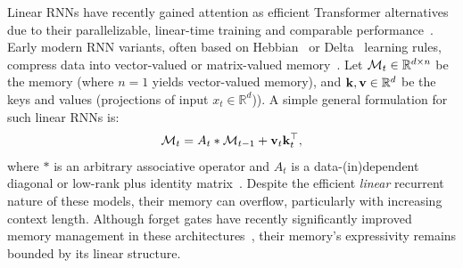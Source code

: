 Linear RNNs have recently gained attention as efficient Transformer alternatives due to their parallelizable, linear-time training and comparable performance~\citep{sun2023retentive, peng2023rwkv}. Early modern RNN variants, often based on Hebbian~\citep{hebb2005organization} or Delta~\citep{widrow1988adaptive} learning rules, compress data into vector-valued or matrix-valued memory~\citep{katharopoulos2020transformers, sun2023retentive, polysketchformer-kacham2024, liu2024longhorn, schlag2021linear, lim2024parallelizing}.
Let $\mathcal{M}_t \in \mathbb{R}^{d \times n}$ be the memory (where $n=1$ yields vector-valued memory), and $\mathbf{k}, \mathbf{v} \in \mathbb{R}^{d}$ be the keys and values (projections of input $x_t \in \mathbb{R}^{d}$)). A simple general formulation for such linear RNNs is:
\begin{align}
    \mathcal{M}_t = A_{t} \ast \mathcal{M}_{t-1} + \mathbf{v}_t \mathbf{k}_t^{\top}, 
\end{align}
where $\ast$ is an arbitrary associative operator and $A_t$
  is a data-(in)dependent diagonal or low-rank plus identity matrix~\citep{yang2024parallelizing}. Despite the efficient \emph{linear} recurrent nature of these models, their memory can overflow, particularly with increasing context length. Although forget gates have recently significantly improved memory management in these architectures~\citep{sun2023retentive, peng2025rwkv7}, their memory's expressivity remains bounded by its linear structure.



